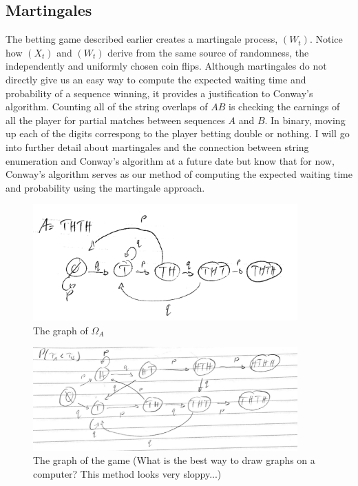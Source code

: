\documentclass{article}
\numberwithin{mytheorem}{subsection} %
\begin{document}
		\subsection{Martingales}
			The betting game described earlier creates a martingale process, $(W_t)$. Notice how $(X_t)$ and $(W_t)$ derive from the same source of randomness, the independently and uniformly chosen coin flips. Although martingales do not directly give us an easy way to compute the expected waiting time and probability of a sequence winning, it provides a justification to Conway's algorithm. Counting all of the string overlaps of $AB$ is checking the earnings of all the player for partial matches between sequences $A$ and $B$. In binary, moving up each of the digits correspong to the player betting double or nothing. I will go into further detail about martingales and the connection between string enumeration and Conway's algorithm at a future date but know that for now, Conway's algorithm serves as our method of computing the expected waiting time and probability using the martingale approach.

		\begin{figure}[h]
			\begin{center}
				\includegraphics[width=4.0in]{GameOfA}
			\end{center}
		
			\caption{The graph of $\Omega_A$}
			\label{perfect_fig}
		\end{figure}
		\begin{figure}[h]
			\begin{center}
				\includegraphics[width=4.0in]{winning}
			\end{center}
		
			\caption{The graph of the game (What is the best way to draw graphs on a computer? This method looks very sloppy...)}
			\label{perfect_fig}
		\end{figure}
\end{document}
